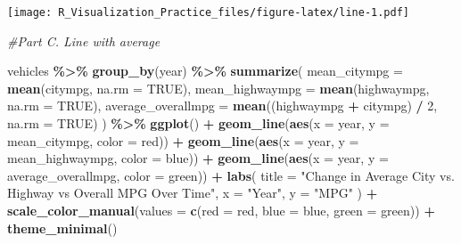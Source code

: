 \documentclass[
]{article}
\newenvironment{Shaded}{\begin{snugshade}}{\end{snugshade}}
\newcommand{\AttributeTok}[1]{\textcolor[rgb]{0.13,0.29,0.53}{#1}}
\newcommand{\CommentTok}[1]{\textcolor[rgb]{0.56,0.35,0.01}{\textit{#1}}}
\newcommand{\ConstantTok}[1]{\textcolor[rgb]{0.56,0.35,0.01}{#1}}
\newcommand{\DecValTok}[1]{\textcolor[rgb]{0.00,0.00,0.81}{#1}}
\newcommand{\FunctionTok}[1]{\textcolor[rgb]{0.13,0.29,0.53}{\textbf{#1}}}
\newcommand{\NormalTok}[1]{#1}
\newcommand{\OtherTok}[1]{\textcolor[rgb]{0.56,0.35,0.01}{#1}}
\newcommand{\SpecialCharTok}[1]{\textcolor[rgb]{0.81,0.36,0.00}{\textbf{#1}}}
\newcommand{\StringTok}[1]{\textcolor[rgb]{0.31,0.60,0.02}{#1}}
\begin{document}
\texttt{[image: R\_Visualization\_Practice\_files/figure-latex/line-1.pdf]}

\begin{Shaded}
\begin{Highlighting}[]
\CommentTok{\#Part C. Line with average }

\NormalTok{vehicles }\SpecialCharTok{\%\textgreater{}\%}
  \FunctionTok{group\_by}\NormalTok{(year) }\SpecialCharTok{\%\textgreater{}\%}
  \FunctionTok{summarize}\NormalTok{(}
    \AttributeTok{mean\_citympg =} \FunctionTok{mean}\NormalTok{(citympg, }\AttributeTok{na.rm =} \ConstantTok{TRUE}\NormalTok{),}
    \AttributeTok{mean\_highwaympg =} \FunctionTok{mean}\NormalTok{(highwaympg, }\AttributeTok{na.rm =} \ConstantTok{TRUE}\NormalTok{),}
    \AttributeTok{average\_overallmpg =} \FunctionTok{mean}\NormalTok{((highwaympg }\SpecialCharTok{+}\NormalTok{ citympg) }\SpecialCharTok{/} \DecValTok{2}\NormalTok{, }\AttributeTok{na.rm =} \ConstantTok{TRUE}\NormalTok{)}
\NormalTok{  ) }\SpecialCharTok{\%\textgreater{}\%}
  \FunctionTok{ggplot}\NormalTok{() }\SpecialCharTok{+}
  \FunctionTok{geom\_line}\NormalTok{(}\FunctionTok{aes}\NormalTok{(}\AttributeTok{x =}\NormalTok{ year, }\AttributeTok{y =}\NormalTok{ mean\_citympg, }\AttributeTok{color =} \StringTok{\textquotesingle{}red\textquotesingle{}}\NormalTok{)) }\SpecialCharTok{+}
  \FunctionTok{geom\_line}\NormalTok{(}\FunctionTok{aes}\NormalTok{(}\AttributeTok{x =}\NormalTok{ year, }\AttributeTok{y =}\NormalTok{ mean\_highwaympg, }\AttributeTok{color =} \StringTok{\textquotesingle{}blue\textquotesingle{}}\NormalTok{)) }\SpecialCharTok{+}
  \FunctionTok{geom\_line}\NormalTok{(}\FunctionTok{aes}\NormalTok{(}\AttributeTok{x =}\NormalTok{ year, }\AttributeTok{y =}\NormalTok{ average\_overallmpg, }\AttributeTok{color =} \StringTok{\textquotesingle{}green\textquotesingle{}}\NormalTok{)) }\SpecialCharTok{+}
  \FunctionTok{labs}\NormalTok{(}
    \AttributeTok{title =} \StringTok{"Change in Average City vs. Highway vs Overall MPG Over Time"}\NormalTok{,}
    \AttributeTok{x =} \StringTok{"Year"}\NormalTok{,}
    \AttributeTok{y =} \StringTok{"MPG"}
\NormalTok{  ) }\SpecialCharTok{+}
  \FunctionTok{scale\_color\_manual}\NormalTok{(}\AttributeTok{values =} \FunctionTok{c}\NormalTok{(}\StringTok{\textquotesingle{}red\textquotesingle{}} \OtherTok{=} \StringTok{\textquotesingle{}red\textquotesingle{}}\NormalTok{, }\StringTok{\textquotesingle{}blue\textquotesingle{}} \OtherTok{=} \StringTok{\textquotesingle{}blue\textquotesingle{}}\NormalTok{, }\StringTok{\textquotesingle{}green\textquotesingle{}} \OtherTok{=} \StringTok{\textquotesingle{}green\textquotesingle{}}\NormalTok{)) }\SpecialCharTok{+}
  \FunctionTok{theme\_minimal}\NormalTok{()}
\end{Highlighting}
\end{Shaded}
\end{document}
